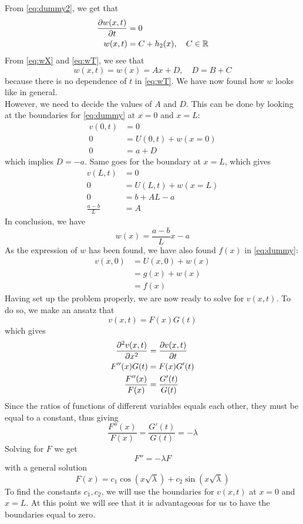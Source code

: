 \documentclass[12pt,english,a4paper]{article}
\begin{document}
From \vref{eq:dummy2}, we get that
\begin{align}
\pdv{w(x,t)}{t} &= 0 \nonumber \\
w(x,t) &= C + h_2(x) , \quad C \in \mathbb{R} \label{eq:wT}
\end{align}
From \vref{eq:wX} and \vref{eq:wT}, we see that
\[
w(x,t) = w(x) = Ax + D, \quad D=B+C
\]
because there is no dependence of \(t\) in \vref{eq:wT}.
We have now found how \(w\) looks like in general. \\
However, we need to decide the values of \(A\) and \(D\). This can be done by looking at the boundaries for \vref{eq:dummy} at \(x = 0 \) and \(x = L\):
\begin{align*}
v(0,t) &= 0 \\
0 &= U(0,t) + w(x=0) \\
0 &= a+D
\end{align*}
which implies \(D = -a\). Same goes for the boundary at \(x = L\), which gives
\begin{align*}
v(L,t) &= 0 \\
0 &= U(L,t) + w(x=L) \\
0 &= b+AL-a \\
\frac{a-b}{L} &= A
\end{align*}
In conclusion, we have
\[
w(x) = \frac{a-b}{L}x - a
\]
As the expression of \(w\) has been found, we have also found \(f(x)\) in \vref{eq:dummy}:
\begin{align*}
	v(x,0) &= U(x,0) + w(x) \\
	&= g(x)+w(x) \\
	&=f(x)
\end{align*}
Having set up the problem properly, we are now ready to solve for \(v(x,t)\). To do so, we make an ansatz that
\[
v(x,t) = F(x)G(t)
\]
which gives
\begin{align}
\pdv[2]{v(x,t)}{x} &= \pdv{v(x,t)}{t} \nonumber \\
F''(x)G(t) &= F(x)G'(t) \nonumber \\
\frac{F''(x)}{F(x)} &= \frac{G'(t)}{G(t)} \label{eq:ration}
\end{align}
Since the ratios of functions of different variables equals each other, they must be equal to a constant, thus giving
\[
\frac{F''(x)}{F(x)} = \frac{G'(t)}{G(t)} = -\lambda
\]
Solving for \(F\) we get
\[
	F'' = -\lambda F
\]
with a general solution
\[
F(x) = c_1\cos(x\sqrt{\lambda} ) + c_2\sin(x\sqrt{\lambda})
\]
To find the constants \(c_1,c_2\), we will use the boundaries for \(v(x,t)\) at \(x = 0\) and \(x = L\). At this point we will see that it is advantageous for us to have the boundaries equal to zero.\\
\end{document}
